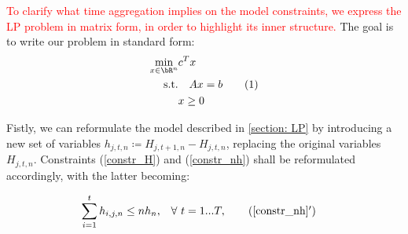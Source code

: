 \textcolor{red}{To clarify what time aggregation implies on the model constraints, we express the LP problem in matrix form, in order to highlight its inner structure.}
The goal is to write our problem in standard form:
\begin{align*}
\min_{x \in \bR^{n}} &c^T x \\ 
\text{s.t.} &\quad Ax = b \stepcounter{equation}\tag{\theequation}\label{std_LP}\\
&x \geq 0
\end{align*}

Fistly, we can reformulate the model described in \ref{section: LP} by introducing a new set of variables 
\(h_{j,t,n} \coloneqq H_{j,t+1,n} - H_{j,t,n}\), replacing the original variables \(H_{j,t,n}\). Constraints (\ref{constr_H}) and (\ref{constr_nh}) shall be reformulated accordingly, with the latter becoming:

\begin{align}
  \sum_{i=1}^{t} h_{i,j,n} \le nh_{n}, & \quad \forall\  t =1...T, \tag{\ref{constr_nh}$'$}\label{eq:delta_hydrogen_constraints}
\end{align}



